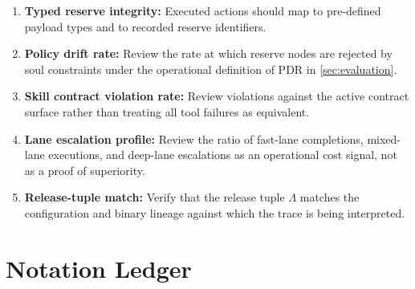 \documentclass[11pt]{article}
\theoremstyle{remark}
\begin{document}
\begin{enumerate}[leftmargin=1.5em]
\item \textbf{Typed reserve integrity:} Executed actions should map to pre-defined payload types and to recorded reserve identifiers.
\item \textbf{Policy drift rate:} Review the rate at which reserve nodes are rejected by soul constraints under the operational definition of \(\mathrm{PDR}\) in \cref{sec:evaluation}.
\item \textbf{Skill contract violation rate:} Review violations against the active contract surface rather than treating all tool failures as equivalent.
\item \textbf{Lane escalation profile:} Review the ratio of fast-lane completions, mixed-lane executions, and deep-lane escalations as an operational cost signal, not as a proof of superiority.
\item \textbf{Release-tuple match:} Verify that the release tuple \(\Lambda\) matches the configuration and binary lineage against which the trace is being interpreted.
\end{enumerate}
\newpage

\section[Notation]{Notation Ledger}
\end{document}
